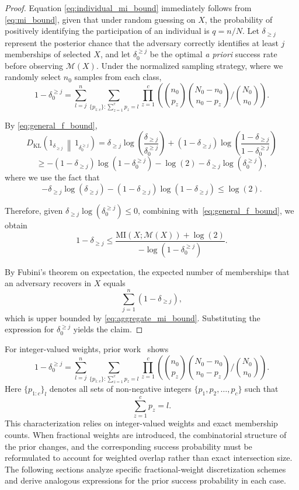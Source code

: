 \documentclass[sigconf,anonymous, review]{acmart}
\begin{document}
\begin{proof}

Equation \eqref{eq:individual_mi_bound} immediately follows from \eqref{eq:mi_bound}, given that under random guessing on $X$, the probability of positively identifying the participation of an individual is $q = n/N$. Let $\delta_{\ge j}$ represent the posterior chance that the adversary correctly identifies at least $j$ memberships of selected $X$, and let $\delta_{0}^{\ge j}$ be the optimal \emph{a priori} success rate before observing $\mathcal{M}(X)$. Under the normalized sampling strategy, where we randomly select $n_0$ samples from each class,
\[
1 - \delta_{0}^{\ge j}
=
\sum_{l=j}^{n}
\sum_{\{p_{1:c}\}: \sum_{z=1}^c p_z = l}
\prod_{z=1}^c
\left(
\binom{n_0}{p_z}
\binom{N_0 - n_0}{n_0 - p_z}
\Big/
\binom{N_0}{n_0}
\right).
\]


By \eqref{eq:general_f_bound},
\[
D_{\mathrm{KL}}\!\left(1_{\delta_{\ge j}} \,\middle\|\, 1_{\delta_0^{\ge j}}\right)
=
\delta_{\ge j} \log\!\left(\frac{\delta_{\ge j}}{\delta_0^{\ge j}}\right)
+
(1-\delta_{\ge j}) \log\!\left(\frac{1-\delta_{\ge j}}{1-\delta_0^{\ge j}}\right)
\]
\[
\ge
-(1-\delta_{\ge j}) \log(1-\delta_0^{\ge j})
- \log(2)
- \delta_{\ge j} \log(\delta_0^{\ge j}),
\]
where we use the fact that
\[
-\delta_{\ge j} \log(\delta_{\ge j})
- (1-\delta_{\ge j}) \log(1-\delta_{\ge j})
\le \log(2).
\]

Therefore, given $\delta_{\ge j} \log(\delta_0^{\ge j}) \le 0$, combining with~\eqref{eq:general_f_bound}, we obtain
\begin{equation}\label{eq:aggregate_mi_bound}
1 - \delta_{\ge j}
\le
\frac{\mathrm{MI}(X;\mathcal{M}(X)) + \log(2)}
{-\log(1-\delta_0^{\ge j})}.
\end{equation}

By Fubini's theorem on expectation, the expected number of memberships that an adversary recovers in $X$ equals
\[
\sum_{j=1}^{n} (1 - \delta_{\ge j}),
\]
which is upper bounded by \eqref{eq:aggregate_mi_bound}. Substituting the expression for $\delta_0^{\ge j}$ yields the claim.

\end{proof}


For integer-valued weights, prior work~\cite{xiao2024formal} shows
\begin{equation}
    1 - \delta_{0}^{\ge j}
=
\sum_{l=j}^{n}
\sum_{\{p_{1:c}\}: \sum_{z=1}^c p_z = l}
\prod_{z=1}^c
\left(
\binom{n_0}{p_z}
\binom{N_0 - n_0}{n_0 - p_z}
\Big/
\binom{N_0}{n_0}
\right).
\end{equation}
Here $\{p_{1:c}\}_l$ denotes all sets of non-negative integers $\{p_1, p_2, \ldots, p_c\}$ such that
\[
\sum_{z=1}^c p_z = l.
\]
This characterization relies on integer-valued weights and exact membership counts. When fractional weights are introduced, the combinatorial structure of the prior changes, and the corresponding success probability must be reformulated to account for weighted overlap rather than exact intersection size. The following sections analyze specific fractional-weight discretization schemes and derive analogous expressions for the prior success probability in each case.
\end{document}
